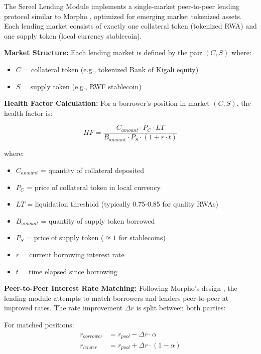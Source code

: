 \documentclass[12pt]{article}
\begin{document}
The Sereel Lending Module implements a single-market peer-to-peer lending protocol similar to Morpho \citep{morphoblue2023whitepaper}, optimized for emerging market tokenized assets. Each lending market consists of exactly one collateral token (tokenized RWA) and one supply token (local currency stablecoin).

\textbf{Market Structure:}
Each lending market is defined by the pair $(C, S)$ where:
\begin{itemize}
\item $C$ = collateral token (e.g., tokenized Bank of Kigali equity)
\item $S$ = supply token (e.g., RWF stablecoin)
\end{itemize}

\textbf{Health Factor Calculation:}
For a borrower's position in market $(C, S)$, the health factor is:

\begin{equation}
HF = \frac{C_{amount} \cdot P_C \cdot LT}{B_{amount} \cdot P_S \cdot (1 + r \cdot t)}
\end{equation}

where:
\begin{itemize}
\item $C_{amount}$ = quantity of collateral deposited
\item $P_C$ = price of collateral token in local currency
\item $LT$ = liquidation threshold (typically 0.75-0.85 for quality RWAs)
\item $B_{amount}$ = quantity of supply token borrowed
\item $P_S$ = price of supply token ($\approxeq 1$ for stablecoins)
\item $r$ = current borrowing interest rate
\item $t$ = time elapsed since borrowing
\end{itemize}

\textbf{Peer-to-Peer Interest Rate Matching:}
Following Morpho's design \citep{morphoblue2023whitepaper}, the lending module attempts to match borrowers and lenders peer-to-peer at improved rates. The rate improvement $\Delta r$ is split between both parties:

For matched positions:
\begin{align}
r_{borrower} &= r_{pool} - \Delta r \cdot \alpha \\
r_{lender} &= r_{pool} + \Delta r \cdot (1 - \alpha)
\end{align}
\end{document}
